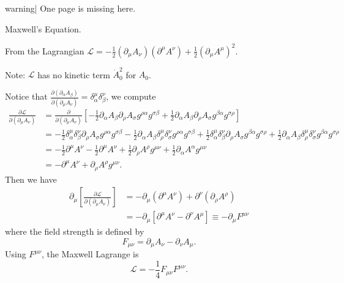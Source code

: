 {{warning| One page is missing here.}}

\begin{example} Maxwell's Equation.

    \qquad From the Lagrangian $\mathcal{L}= - \frac{1}{2}(\partial_\mu A_\nu)(\partial^\mu A^\nu) + \frac{1}{2} (\partial_\mu A^\mu)^2$.

    \qquad Note: $\mathcal{L}$ has no kinetic term $\dot{A}_0^2 $ for $A_0$.

    \qquad Notice that $\frac{\partial(\partial_\alpha A_\beta)}{\partial( \partial_\mu A_\nu)} = \delta^\mu_\alpha \delta^\nu_\beta$, we compute
        \begin{align*}
            \frac{\partial \mathcal{L}}{\partial (\partial_\mu A_\nu)} &= \frac{\partial }{\partial (\partial_\mu A_\nu)}[-\frac{1}{2}\partial_\alpha A_\beta \partial_\rho A_\sigma g^{\rho \alpha} g^{\sigma \beta}+ \frac{1}{2}\partial_\alpha A_\beta \partial_\rho A_\sigma g^{\beta \alpha }g^{\sigma \rho}]\\
                &= -\frac{1}{2} \delta^\mu_\alpha \delta^\nu_\beta \partial_\rho A_\sigma g^{\rho \alpha}g^{\sigma \beta} - \frac{1}{2}\partial_\alpha A_\beta \delta^\mu_\rho \delta^\nu_\sigma g^{\rho\alpha} g^{\sigma \beta} +\frac{1}{2} \delta^\mu_\alpha \delta^\nu_\beta \partial_\rho A_\sigma g^{\beta\alpha} g^{\sigma \rho} + \frac{1}{2} \partial_\alpha A_\beta \delta^\mu_\rho \delta^\nu_\sigma g^{\beta \alpha} g^{\sigma \rho}\\
                &= -\frac{1}{2} \partial^\mu A^\nu - \frac{1}{2} \partial^\mu A^\nu + \frac{1}{2} \partial_\rho A^\rho g^{\mu \nu} + \frac{1}{2} \partial_\alpha A^\alpha g^{\mu \nu}\\
                &= - \partial^\mu A^\nu + \partial_\rho A^\rho g^{\mu \nu}.
        \end{align*}
    Then we have
            \begin{align*}
                \partial_\mu [\frac{\partial \mathcal{L}}{\partial (\partial_\mu A_\nu)}] 
                    &= -\partial_\mu(\partial^\mu A^\nu) + \partial^\nu(\partial_\rho A^\rho)\\
                    &= -\partial_\mu[\partial^\mu A^\nu - \partial^\nu A^\mu] \equiv -\partial_\mu F^{\mu \nu}
            \end{align*}
    where the field strength is defined by
                $$F_{\mu \nu} = \partial_\mu A_\nu - \partial_\nu A_\mu.$$
    Using $F^{\mu \nu}$, the Maxwell Lagrange is 
                $$\mathcal{L}= -\frac{1}{4}F_{\mu\nu} F^{\mu\nu}.$$
\end{example}


